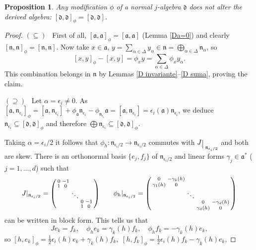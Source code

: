 \documentclass[12pt, twoside]{amsart}
\def\d{\mathfrak{d}}
\def\n{\mathfrak{n}}
\def\a{\mathfrak{a}}
\newcommand{\restr}{\raisebox{-.2em}{$\!\big\arrowvert$}}
\newenvironment{spmatrix}{\left(\smallmatrix}{\endsmallmatrix\right)}
\newtheorem{prop}[definition]{Proposition}
\theoremstyle{definition}
\begin{document}
\begin{prop} \label{conmutador modi igual}
Any modification $\phi$ of a  normal $j$-algebra $\d$ does not alter the derived algebra: $[\d,\d]_{\phi}=[\d,\d]$.
\end{prop}

\begin{proof}
$(\subseteq)$ \ First of all, $[\a,\a]_{\phi}=[\a,\a]$ (Lemma \ref{Da=0}) and clearly $[\n,\n]_{\phi}=[\n,\n]$. 
Now take $x\in \a$, $y=\sum_{\alpha \in \Delta}y_{\alpha} \in \n=\bigoplus_{\alpha \in \Delta} \n_{\alpha}$, so 
$$[x,y]_{\phi}- [x,y] =\phi_x y = \sum_{\alpha \in \Delta}\phi_x y_{\alpha}.
$$
This combination belongs in $\n$ by Lemmas \ref{D invariante}--\ref{D suma}, proving the claim. \par
%
\quad $(\supseteq)$ \  Let $\alpha=\epsilon_i\neq 0$. As 
$[\a, \n_{\epsilon_i}]_{\phi}=[\a, \n_{\epsilon_i}]+\phi_\a \n_{\epsilon_i}-\phi_{\n_{\epsilon_i}} \a=[\a, \n_{\epsilon_i}]=\epsilon_{i}(\a)\n_{\epsilon_i}$, we deduce $\n_{\epsilon_i} \subseteq [\d,\d]_{\phi}$ and therefore $\bigoplus \n_{\epsilon_i} \subseteq [\d,\d]_{\phi}$.\par
\quad Taking $\alpha=\epsilon_i/2$ it follows that $\phi_h\colon \n_{\epsilon_i/2} \to \n_{\epsilon_i/2}$ commutes with  $J\restr_{\n_{\epsilon_i/2}}$ and both are skew. There is an orthonormal basis  $\{e_j,f_j \}$ of $\n_{\epsilon_i/2}$ and linear forms $\gamma_j\in \a^*$ ($j=1,\ldots,  d$) such that
\[  J \vert_{\n_{\epsilon_i/2}}=\begin{spmatrix}
   0 & -1 &  & &\\ 
   1& 0 &  & &\\ 
   &  &  \ddots & &\\
   &  & &  0 & -1\\
   &  & & 1 & 0 
 \end{spmatrix} 
\qquad 
  \phi_h  \vert_{\n_{\epsilon_i/2}}=\begin{spmatrix}
   0 & -\gamma_{1}(h) &  & & \\ 
   \gamma_{1}(h)& 0 &  & &\\ 
   &  &  \ddots & & \\
   &  &  & 0 & -\gamma_{d}(h)\\
   &  &  & \gamma_{d}(h) & 0 
 \end{spmatrix}\]
can be written in block form. This tells us that
\[Je_k=f_k, \quad  \phi_h e_k= \gamma_{k}(h)f_k, \quad  \phi_h f_k=-\gamma_{k}(h)e_k,\]
so 
$[h,e_k]_{\phi}=\tfrac{1}{2}\epsilon_{i}(h)e_k+ \gamma_{k}(h)f_k$,\ $
    [h, f_k]_{\phi}= \tfrac{1}{2}\epsilon_{i}(h)f_k-\gamma_{k}(h)e_k$, 

\end{proof}
\end{document}
